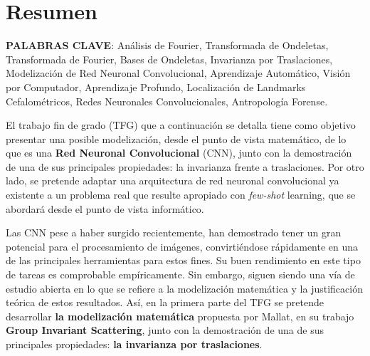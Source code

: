 %


\chapter{Resumen}

\textbf{PALABRAS CLAVE}: Análisis de Fourier, Transformada de Ondeletas, Transformada de Fourier, Bases de Ondeletas, Invarianza por Traslaciones, Modelización de Red Neuronal Convolucional, Aprendizaje Automático, Visión por Computador, Aprendizaje Profundo, Localización de Landmarks Cefalométricos, Redes Neuronales Convolucionales, Antropología Forense.

\vspace{15mm}
\noindent El trabajo fin de grado (TFG) que a continuación se detalla tiene como objetivo presentar una posible modelización, desde el punto de vista matemático, de lo que es una \textbf{Red Neuronal Convolucional} (CNN), junto con la demostración de una de sus principales propiedades: la invarianza frente a traslaciones. Por otro lado, se pretende adaptar una arquitectura de red neuronal convolucional ya existente a un problema real que resulte apropiado con \textit{few-shot} learning, que se abordará desde el punto de vista informático.

\medskip

\noindent Las CNN pese a haber surgido recientemente, han demostrado tener un gran potencial para el procesamiento de imágenes, convirtiéndose rápidamente en una de las principales herramientas para estos fines. Su buen rendimiento en este tipo de tareas es comprobable empíricamente. Sin embargo, siguen siendo una vía de estudio abierta en lo que se refiere a la modelización matemática y la justificación teórica de estos resultados. Así, en la primera parte del TFG se pretende desarrollar \textbf{la modelización matemática} propuesta por Mallat, en su trabajo \textbf{Group Invariant Scattering}, junto con la demostración de una de sus principales propiedades: \textbf{la invarianza por traslaciones}.

\medskip

